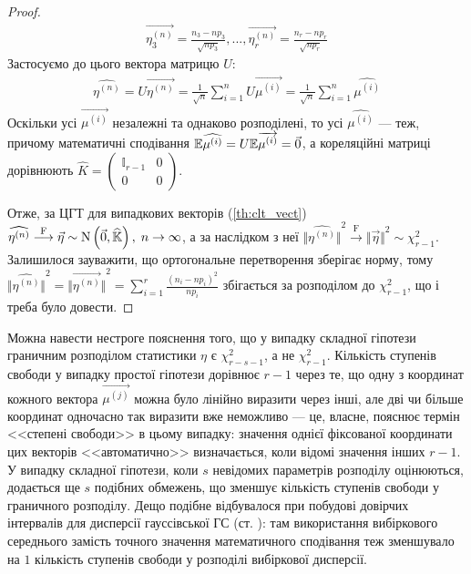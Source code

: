 \begin{proof}
\begin{gather*}
        \overrightarrow{\eta^{(n)}_3} = \frac{n_3 - n p_3}{\sqrt{n p_3}}, ..., 
        \overrightarrow{\eta^{(n)}_r} = \frac{n_r - n p_r}{\sqrt{n p_r}}
    \end{gather*}
    Застосуємо до цього вектора матрицю $U$:
    \begin{gather*}
        \widehat{\eta^{(n)}} = U \overrightarrow{\eta^{(n)}} = \frac{1}{\sqrt{n}}
        \sum\limits_{i=1}^n U \overrightarrow{\mu^{(i)}} = 
        \frac{1}{\sqrt{n}} \sum\limits_{i=1}^n \widehat{\mu^{(i)}}
    \end{gather*}
    Оскільки усі $\overrightarrow{\mu^{(i)}}$ незалежні та однаково розподілені, то усі $\widehat{\mu^{(i)}}$ --- теж, причому
    математичні сподівання $\mathbb{E} \widehat{\mu^{(i)}} = U \mathbb{E} \overrightarrow{\mu^{(i)}} = \vec{0}$,
    а кореляційні матриці дорівнюють $\widehat{K} = \begin{pmatrix}
        \mathbb{I}_{r-1} & 0 \\
        0 & 0 
    \end{pmatrix}$.

    Отже, за ЦГТ для випадкових векторів (\ref{th:clt_vect})
    $\widehat{\eta^{(n)}} \overset{\mathrm{F}}{\longrightarrow} \vec{\eta} \sim \mathrm{N}\left(\vec{0}, \widehat{\mathbb{K}}\right), \; n\to\infty$, 
    а за наслідком з неї
    ${\Big\Vert \widehat{\eta^{(n)}}\Big\Vert}^2 \overset{\mathrm{F}}{\longrightarrow} {\Vert \vec{\eta} \Vert}^2 \sim \chi^2_{r-1}$.
    Залишилося зауважити, що ортогональне перетворення зберігає норму, тому
    $
        {\Big\Vert \widehat{\eta^{(n)}}\Big\Vert}^2 = {\Big\Vert \overrightarrow{\eta^{(n)}}\Big\Vert}^2 = 
        \sum\limits_{i=1}^r \frac{\left(n_i - n p_i\right)^2}{n p_i}
    $ збігається за розподілом до $\chi^2_{r-1}$, що і треба було довести.
\end{proof}

\begin{remark}
    Можна навести нестроге пояснення того, що у випадку складної гіпотези граничним розподілом статистики $\eta$
    є $\chi^2_{r-s-1}$, а не $\chi^2_{r-1}$. Кількість ступенів свободи у випадку простої гіпотези дорівнює $r-1$
    через те, що одну з координат кожного вектора $\overrightarrow{\mu^{(j)}}$ можна було лінійно виразити через інші, але дві чи більше
    координат одночасно так виразити вже неможливо --- це, власне, пояснює термін <<степені свободи>> в цьому випадку: значення однієї фіксованої координати
    цих векторів <<автоматично>> визначається, коли відомі значення інших $r-1$. У випадку складної гіпотези, коли $s$ невідомих параметрів розподілу оцінюються,
    додається ще $s$ подібних обмежень, що зменшує кількість ступенів свободи у граничного розподілу. Дещо подібне відбувалося при побудові довірчих інтервалів
    для дисперсії гауссівської ГС (ст. \pageref{normal_variance_conf_interv}): там використання вибіркового середнього замість точного значення математичного сподівання
    теж зменшувало на $1$ кількість ступенів свободи у розподілі вибіркової дисперсії.
\end{remark}

